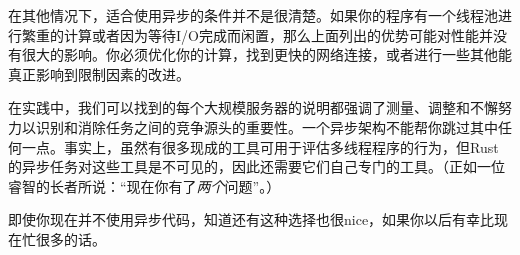 在其他情况下，适合使用异步的条件并不是很清楚。如果你的程序有一个线程池进行繁重的计算或者因为等待I/O完成而闲置，那么上面列出的优势可能对性能并没有很大的影响。你必须优化你的计算，找到更快的网络连接，或者进行一些其他能真正影响到限制因素的改进。

在实践中，我们可以找到的每个大规模服务器的说明都强调了测量、调整和不懈努力以识别和消除任务之间的竞争源头的重要性。一个异步架构不能帮你跳过其中任何一点。事实上，虽然有很多现成的工具可用于评估多线程程序的行为，但Rust的异步任务对这些工具是不可见的，因此还需要它们自己专门的工具。（正如一位睿智的长者所说：“现在你有了\emph{两个}问题”。）

即使你现在并不使用异步代码，知道还有这种选择也很nice，如果你以后有幸比现在忙很多的话。

